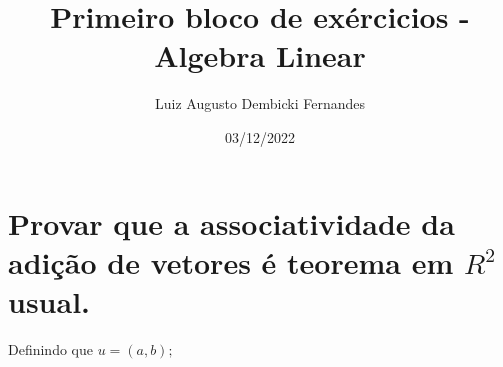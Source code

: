 \documentclass[12pt, twoside, a4]{article} %
\begin{document}
\title{Primeiro bloco de exércicios - Algebra Linear}
\author{Luiz Augusto Dembicki Fernandes}
\date{03/12/2022}
\maketitle

\section{Provar que a associatividade da adição de vetores é teorema em $ R^2 $ usual.}

Definindo que $ u = (a, b); $
\end{document}
